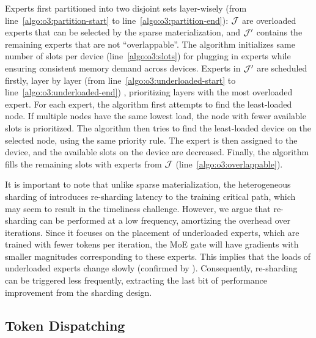 Experts first partitioned into two disjoint sets layer-wisely (from line~\ref{algo:o3:partition-start} to line~\ref{algo:o3:partition-end}): $\mathcal{J}$ are overloaded experts that can be selected by the sparse materialization, and $\mathcal{J}'$ contains the remaining experts that are not ``overlappable''. 
The algorithm initializes same number of slots per device (line~\ref{algo:o3:slots}) for plugging in experts while ensuring consistent memory demand across devices. 
Experts in $\mathcal{J}'$ are scheduled firstly, layer by layer 
(from line~\ref{algo:o3:underloaded-start} to line~\ref{algo:o3:underloaded-end})
, prioritizing layers with the most overloaded expert.
For each expert, the algorithm first attempts to find the least-loaded node. If multiple nodes have the same lowest load, the node with fewer available slots is prioritized. 
The algorithm then tries to find the least-loaded device on the selected node, using the same priority rule. 
The expert is then assigned to the device, and the available slots on the device are decreased. 
Finally, the algorithm fills the remaining slots with experts from $\mathcal{J}$ (line~\ref{algo:o3:overlappable}). 



It is important to note that unlike sparse materialization, the heterogeneous sharding of \xxx introduces re-sharding latency to the training critical path, which may seem to result in the timeliness challenge. However, we argue that re-sharding can be performed at a low frequency, amortizing the overhead over iterations. Since it focuses on the placement of underloaded experts, which are trained with fewer tokens per iteration, the MoE gate will have gradients with smaller magnitudes corresponding to these experts. This implies that the loads of underloaded experts change slowly (confirmed by ). Consequently, re-sharding can be triggered less frequently, extracting the last bit of performance improvement from the \yyy sharding design.



\subsection{Token Dispatching}\label{sec:arch:dispatch}



